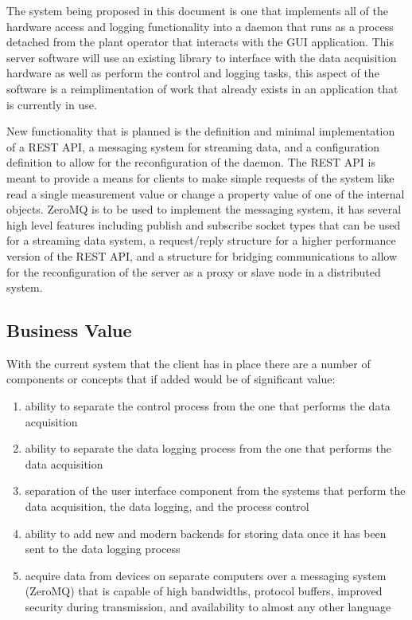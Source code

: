 \documentclass[11pt]{article}
\begin{document}
    The system being proposed in this document is one that implements all of
    the hardware access and logging functionality into a daemon that runs as a
    process detached from the plant operator that interacts with the GUI
    application. This server software will use an existing library to interface
    with the data acquisition hardware as well as perform the control and
    logging tasks, this aspect of the software is a reimplimentation of work
    that already exists in an application that is currently in use.

    New functionality that is planned is the definition and minimal
    implementation of a REST API, a messaging system for streaming data, and a
    configuration definition to allow for the reconfiguration of the daemon. The
    REST API is meant to provide a means for clients to make simple requests of
    the system like read a single measurement value or change a property value
    of one of the internal objects. ZeroMQ is to be used to implement the
    messaging system, it has several high level features including publish and
    subscribe socket types that can be used for a streaming data system, a
    request/reply structure for a higher performance version of the REST API,
    and a structure for bridging communications to allow for the reconfiguration
    of the server as a proxy or slave node in a distributed system.

    \subsection{Business Value}\label{sec:soln-val}

      With the current system that the client has in place there are a number
      of components or concepts that if added would be of significant value:

      \begin{enumerate}
        \item ability to separate the control process from the one that
              performs the data acquisition
        \item ability to separate the data logging process from the one that
              performs the data acquisition
        \item separation of the user interface component from the systems that
              perform the data acquisition, the data logging, and the process
              control
        \item ability to add new and modern backends for storing data once it
              has been sent to the data logging process
        \item acquire data from devices on separate computers over a messaging
              system (ZeroMQ) that is capable of high bandwidths, protocol
              buffers, improved security during transmission, and availability
              to almost any other language
      \end{enumerate}
\end{document}
